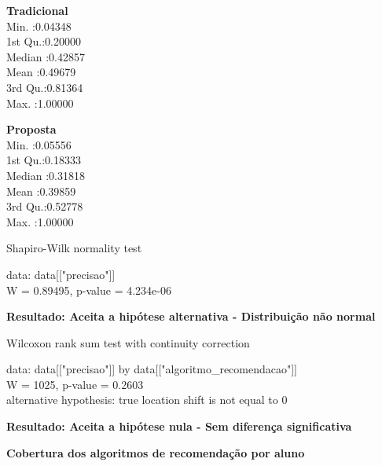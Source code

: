 \begin{multicols}{2}

\noindent\textbf{Tradicional}\\
Min.   :0.04348\\
1st Qu.:0.20000\\
Median :0.42857\\
Mean   :0.49679\\
3rd Qu.:0.81364\\
Max.   :1.00000\\

\columnbreak

\noindent\textbf{Proposta}\\
Min.   :0.05556\\
1st Qu.:0.18333\\
Median :0.31818\\
Mean   :0.39859\\
3rd Qu.:0.52778\\
Max.   :1.00000
\end{multicols}

  Shapiro-Wilk normality test

\noindent
data:  data[["precisao"]]\\
W = 0.89495, p-value = 4.234e-06

\textbf{Resultado: Aceita a hipótese alternativa - Distribuição não normal}

Wilcoxon rank sum test with continuity correction

\noindent
data:  data[["precisao"]] by data[["algoritmo\_recomendacao"]]\\
W = 1025, p-value = 0.2603\\
alternative hypothesis: true location shift is not equal to 0

\textbf{Resultado: Aceita a hipótese nula - Sem diferença significativa}

\textbf{Cobertura dos algoritmos de recomendação por aluno}

